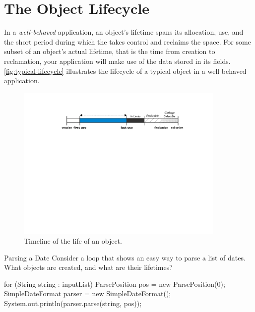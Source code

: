 \chapter{The Object Lifecycle}


In a \emph{well-behaved} application, an object's lifetime spans its allocation,
use, and the short period during which the \jre takes control and reclaims the
space. For some subset of an object's actual lifetime, that is the time from
creation to reclamation, your application will make use of the data stored in its
fields. \autoref{fig:typical-lifecycle} illustrates the lifecycle of a typical
object in a well behaved application.

\begin{figure}
	\includegraphics[width=0.9\textwidth]{part4/Figures/lifetime/object-lifecycle}
	\caption{Timeline of the life of an object.}
	\label{fig:typical-lifecycle}
\end{figure}

\begin{example}{Parsing a Date} Consider a loop that shows an easy way to parse
a list of dates. What objects are created, and what are their lifetimes?
\begin{shortlisting}
for (String string : inputList) {
	ParsePosition pos = new ParsePosition(0);
	SimpleDateFormat parser = new SimpleDateFormat();
	System.out.println(parser.parse(string, pos));
}
\end{shortlisting}
\end{example}

